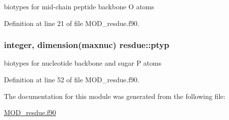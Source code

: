 biotypes for mid-\/chain peptide backbone O atoms 



Definition at line 21 of file M\-O\-D\-\_\-resdue.\-f90.

\hypertarget{classresdue_a40674f05ab57e66b0176b1f62b3e9af1}{
\subsubsection[{ptyp}]{\setlength{\rightskip}{0pt plus 5cm}integer, dimension(maxnuc) resdue\-::ptyp}}\label{classresdue_a40674f05ab57e66b0176b1f62b3e9af1}


biotypes for nucleotide backbone and sugar P atoms 



Definition at line 52 of file M\-O\-D\-\_\-resdue.\-f90.



The documentation for this module was generated from the following file\-:\begin{DoxyCompactItemize}
\item 
\hyperlink{MOD__resdue_8f90}{M\-O\-D\-\_\-resdue.\-f90}\end{DoxyCompactItemize}

